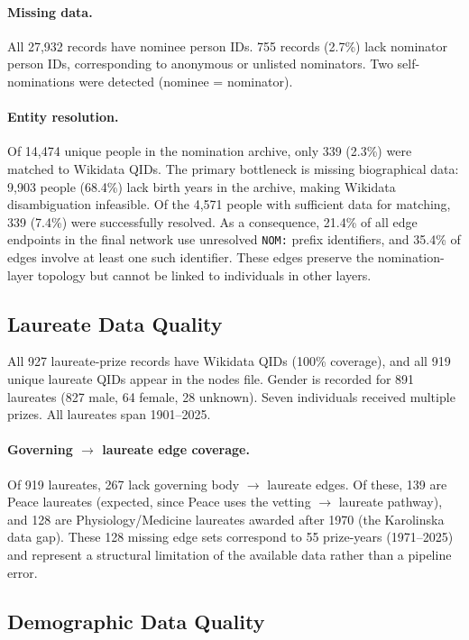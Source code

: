 \paragraph{Missing data.} All 27{,}932 records have nominee person IDs.
755 records (2.7\%) lack nominator person IDs, corresponding to anonymous
or unlisted nominators. Two self-nominations were detected (nominee =
nominator).

\paragraph{Entity resolution.} Of 14{,}474 unique people in the nomination
archive, only 339 (2.3\%) were matched to Wikidata QIDs. The primary
bottleneck is missing biographical data: 9{,}903 people (68.4\%) lack
birth years in the archive, making Wikidata disambiguation infeasible.
Of the 4{,}571 people with sufficient data for matching, 339 (7.4\%) were
successfully resolved. As a consequence, 21.4\% of all edge endpoints
in the final network use unresolved \texttt{NOM:} prefix identifiers, and
35.4\% of edges involve at least one such identifier. These edges preserve
the nomination-layer topology but cannot be linked to individuals in other
layers.

\subsection{Laureate Data Quality}

All 927 laureate-prize records have Wikidata QIDs (100\% coverage), and
all 919 unique laureate QIDs appear in the nodes file. Gender is recorded
for 891 laureates (827 male, 64 female, 28 unknown). Seven individuals
received multiple prizes. All laureates span 1901--2025.

\paragraph{Governing $\to$ laureate edge coverage.} Of 919 laureates, 267
lack governing body $\to$ laureate edges. Of these, 139 are Peace laureates
(expected, since Peace uses the vetting $\to$ laureate pathway), and 128
are Physiology/Medicine laureates awarded after 1970 (the Karolinska data
gap). These 128 missing edge sets correspond to 55 prize-years
(1971--2025) and represent a structural limitation of the available data
rather than a pipeline error.

\subsection{Demographic Data Quality}

